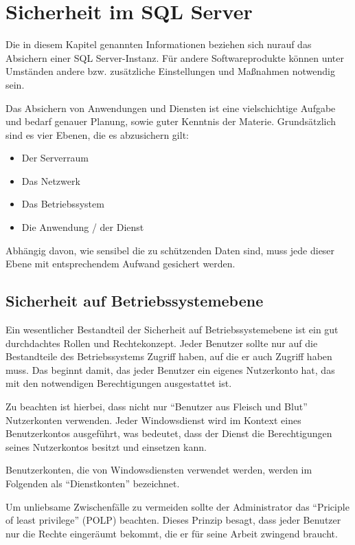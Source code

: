   \chapter{Sicherheit im SQL Server}
  \chaptertoc{}
  \cleardoubleevenpage
    \begin{merke}
      Die in diesem Kapitel genannten Informationen beziehen sich nurauf das
      Absichern einer SQL Server-Instanz. Für andere Softwareprodukte können
      unter Umständen andere bzw. zusätzliche Einstellungen und Maßnahmen
      notwendig sein.
    \end{merke}
    Das Absichern von Anwendungen und Diensten ist eine vielschichtige Aufgabe
    und bedarf genauer Planung, sowie guter Kenntnis der Materie. Grundsätzlich
    sind es vier Ebenen, die es abzusichern gilt:
    \begin{itemize}
        \item Der Serverraum
        \item Das Netzwerk
        \item Das Betriebssystem
        \item Die Anwendung / der Dienst
    \end{itemize}
    Abhängig davon, wie sensibel die zu schützenden Daten sind, muss jede
    dieser Ebene mit entsprechendem Aufwand gesichert werden.
    \section{Sicherheit auf Betriebssystemebene}
      Ein wesentlicher Bestandteil der Sicherheit auf Betriebssystemebene ist
      ein gut durchdachtes Rollen und Rechtekonzept. Jeder Benutzer sollte nur
      auf die Bestandteile des Betriebssystems Zugriff haben, auf die er auch
      Zugriff haben muss. Das beginnt damit, das jeder Benutzer ein eigenes
      Nutzerkonto hat, das mit den notwendigen Berechtigungen ausgestattet ist.
      
      Zu beachten ist hierbei, dass nicht nur \enquote{Benutzer aus Fleisch und
      Blut} Nutzerkonten verwenden. Jeder Windowsdienst wird im Kontext eines
      Benutzerkontos ausgeführt, was bedeutet, dass der Dienst die
      Berechtigungen seines Nutzerkontos besitzt und einsetzen kann.
      \begin{merke}
        Benutzerkonten, die von Windowsdiensten verwendet werden, werden im
        Folgenden als \enquote{Dienstkonten} bezeichnet.
      \end{merke}
      Um unliebsame Zwischenfälle zu vermeiden sollte der Administrator das
      \enquote{Priciple of least privilege} (POLP) beachten. Dieses Prinzip
      besagt, dass jeder Benutzer nur die Rechte eingeräumt bekommt, die er für
      seine Arbeit zwingend braucht.
